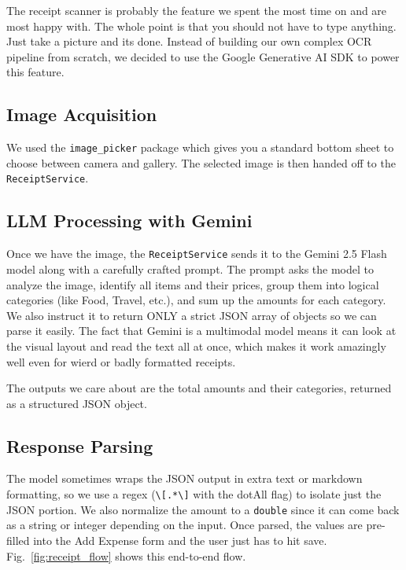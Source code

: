\documentclass[conference]{IEEEtran}
\begin{document}
The receipt scanner is probably the feature we spent the most time on and are most happy with. The whole point is that you should not have to type anything. Just take a picture and its done. Instead of building our own complex OCR pipeline from scratch, we decided to use the Google Generative AI SDK to power this feature.

\subsection{Image Acquisition}

We used the \texttt{image\_picker} package which gives you a standard bottom sheet to choose between camera and gallery. The selected image is then handed off to the \texttt{ReceiptService}.

\subsection{LLM Processing with Gemini}

Once we have the image, the \texttt{ReceiptService} sends it to the Gemini 2.5 Flash model along with a carefully crafted prompt. The prompt asks the model to analyze the image, identify all items and their prices, group them into logical categories (like Food, Travel, etc.), and sum up the amounts for each category. We also instruct it to return ONLY a strict JSON array of objects so we can parse it easily. The fact that Gemini is a multimodal model means it can look at the visual layout and read the text all at once, which makes it work amazingly well even for wierd or badly formatted receipts.

The outputs we care about are the total amounts and their categories, returned as a structured JSON object.

\subsection{Response Parsing}

The model sometimes wraps the JSON output in extra text or markdown formatting, so we use a regex (\verb|\[.*\]| with the dotAll flag) to isolate just the JSON portion. We also normalize the amount to a \texttt{double} since it can come back as a string or integer depending on the input. Once parsed, the values are pre-filled into the Add Expense form and the user just has to hit save. Fig.~\ref{fig:receipt_flow} shows this end-to-end flow.
\end{document}
